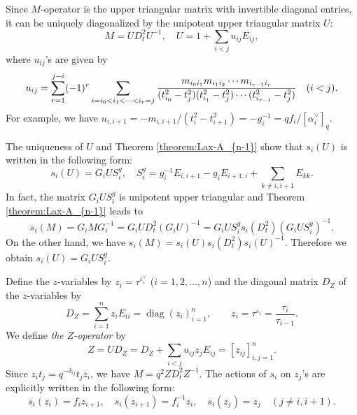 \documentclass[12pt,twoside]{article}
\newcommand\av{\alpha^\vee}
\newcommand\eps{\varepsilon}
\newcommand\epsv{\eps^\vee}
\newcommand\diag{\mathop{\mathrm{diag}}\nolimits}
\theoremstyle{plain} %
\theoremstyle{definition} %
\theoremstyle{definition} %
\numberwithin{theorem}{section}
\numberwithin{equation}{section}
\numberwithin{figure}{section}
\numberwithin{table}{section}
\newcommand\theoremref[1]{Theorem \ref{#1}}
\begin{document}
Since $M$-operator is the upper triangular matrix with
invertible diagonal entries, 
it can be uniquely diagonalized 
by the unipotent upper triangular matrix $U$:
\begin{equation*}
 M = U D_t^2 U^{-1}, \quad
 U = 1 + \sum_{i<j} u_{ij} E_{ij},
\end{equation*}
where $u_{ij}$'s are given by
\begin{equation}
 u_{ij} 
 = \sum_{r=1}^{j-i}(-1)^r
   \sum_{i=i_0<i_1<\cdots<i_r=j}
   \frac{m_{i_0i_1}m_{i_1i_2}\cdots m_{i_{r-1}i_r}}
        {(t_{i_0}^2-t_j^2)(t_{i_1}^2-t_j^2)\cdots(t_{i_{r-1}}^2-t_j^2)}
 \quad (i<j).
 \label{eq:u_{ij}}
\end{equation}
For example, we have 
$u_{i,i+1} = -m_{i,i+1}/(t_i^2-t_{i+1}^2)=-g_i^{-1} = qf_i/[\av_i]_q$. 

The uniqueness of $U$ and \theoremref{theorem:Lax-A_{n-1}} show that
$s_i(U)$ is written in the following form:
\begin{equation}
 s_i(U) = G_i U S_i^g, \quad
 S_i^g = g_i^{-1} E_{i,i+1} - g_i E_{i+1,i} + \sum_{k\ne i,i+1} E_{kk}.
 \label{eq:s_i(U)}
\end{equation}
In fact, the matrix $G_i U S_i^g$ is unipotent upper triangular 
and \theoremref{theorem:Lax-A_{n-1}} leads to
\begin{equation*}
 s_i(M) 
 = G_i M G_i^{-1}
 = G_i U D_t^2 (G_i U)^{-1}
 = G_i U S_i^g s_i(D_t^2) (G_i U S_i^g)^{-1}.
\end{equation*}
On the other hand, we have $s_i(M)=s_i(U)s_i(D_t^2)s_i(U)^{-1}$.
Therefore we obtain $s_i(U)=G_i U S_i^g$.

Define the $z$-variables by $z_i = \tau^{\epsv_i}$ ($i=1,2,\ldots,n$) 
and the diagonal matrix $D_Z$ of the $z$-variables by
\begin{equation*}
 D_Z = \sum_{i=1}^n z_i E_{ii} = \diag(z_i)_{i=1}^n,
 \qquad z_i = \tau^{\eps_i} = \frac{\tau_i}{\tau_{i-1}}.
\end{equation*}
We define {\em the $Z$-operator} by
\begin{equation*}
 Z = U D_Z = D_Z + \sum_{i<j} u_{ij}z_j E_{ij} = [z_{ij}]_{i,j=1}^n.
\end{equation*}
Since $z_i t_j = q^{-\delta_{ij}} t_j z_i$, 
we have $M = q^2 Z D_t^2 Z^{-1}$. 
The actions of $s_i$ on $z_j$'s are explicitly written in the following form:
\begin{equation*}
 s_i(z_i)= f_i z_{i+1}, \quad
 s_i(z_{i+1}) = f_i^{-1} z_i, \quad
 s_i(z_j) = z_j \quad (j\ne i,i+1).
\end{equation*}
\end{document}
